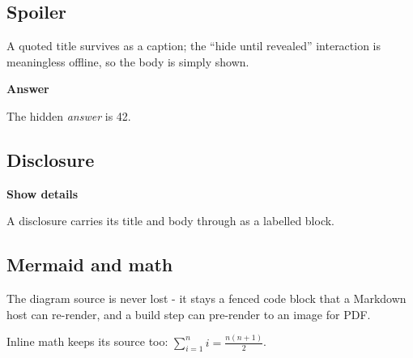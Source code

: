 \subsection{Spoiler}\label{Spoiler}

A quoted title survives as a caption; the ``hide until revealed''
interaction is meaningless offline, so the body is simply shown.

\textbf{Answer}

The hidden \emph{answer} is 42.

\subsection{Disclosure}\label{Disclosure}

\textbf{Show details}

A disclosure carries its title and body through as a labelled block.

\subsection{Mermaid and math}\label{Mermaid-and-math}

The diagram source is never lost - it stays a fenced code block that a
Markdown host can re-render, and a build step can pre-render to an image
for PDF.

\begin{Shaded}
\begin{Highlighting}[]
 \NormalTok{; }\NormalTok{[}\NormalTok{] }\PreprocessorTok{{-}{-}\textgreater{}} \NormalTok{[}\NormalTok{]; } \PreprocessorTok{{-}{-}\textgreater{}} \NormalTok{[}\NormalTok{];}
\end{Highlighting}
\end{Shaded}

Inline math keeps its source too:
\(\sum_{i=1}^{n} i = \frac{n(n+1)}{2}\).

